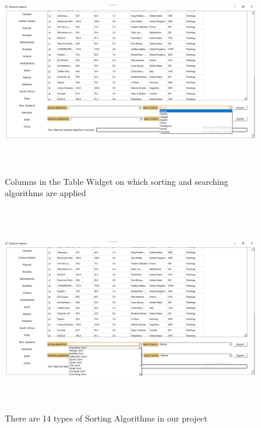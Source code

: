 \documentclass[12pt]{article}
\begin{document}
    \newpage
    \begin{figure}[ht!]
	    \includegraphics[width = 16cm, height = 9cm]{Columns.png}
	    \renewcommand{\thefigure}{3.3}
	    \caption{Columns in the Table Widget on which sorting and searching algorithms are applied}
    \end{figure}
    \begin{figure}[ht!]
	    \includegraphics[width = 16cm, height = 9cm]{Sorting Algorithms.png}
	    \renewcommand{\thefigure}{3.4}
	    \caption{There are 14 types of Sorting Algorithms in our project}
    \end{figure}
    
\end{document}
